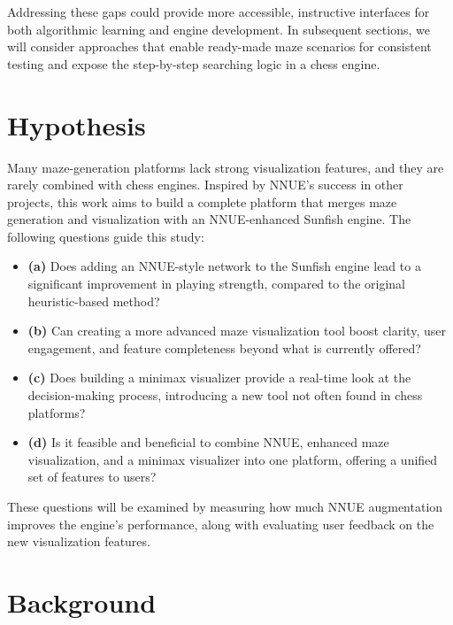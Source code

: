 \documentclass[12pt,a4paper]{article}
\begin{document}
Addressing these gaps could provide more accessible, instructive interfaces for both algorithmic learning and engine development. In subsequent sections, we will consider approaches that enable ready-made maze scenarios for consistent testing and expose the step-by-step searching logic in a chess engine.

\section{Hypothesis}
\label{sec:hypothesis}

Many maze-generation platforms lack strong visualization features, and they are
rarely combined with chess engines. Inspired by NNUE’s success in other projects,
this work aims to build a complete platform that merges maze generation and
visualization with an NNUE-enhanced Sunfish engine. The following questions guide
this study:

\begin{itemize}[label={}, leftmargin=1em]

\item \textbf{(a)} Does adding an NNUE-style network to the Sunfish engine lead
to a significant improvement in playing strength, compared to the original
heuristic-based method?

\item \textbf{(b)} Can creating a more advanced maze visualization tool boost
clarity, user engagement, and feature completeness beyond what is currently
offered?

\item \textbf{(c)} Does building a minimax visualizer provide a real-time look
at the decision-making process, introducing a new tool not often found in chess
platforms?

\item \textbf{(d)} Is it feasible and beneficial to combine NNUE, enhanced maze
visualization, and a minimax visualizer into one platform, offering a unified set
of features to users?

\end{itemize}

These questions will be examined by measuring how much NNUE augmentation
improves the engine’s performance, along with evaluating user feedback on the
new visualization features.

\section{Background}
\label{sec:Background}
\end{document}
